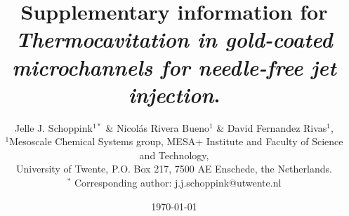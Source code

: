 \documentclass[11pt]{article}
\title{\vspace{-3 cm}\noindent \huge Supplementary information for \textit{Thermocavitation in gold-coated microchannels for needle-free jet injection}.}
\author{Jelle J. Schoppink$^{1*}$ \& Nicolás Rivera Bueno$^1$ \&
David Fernandez Rivas$^1$, \\ 
\small$^1$Mesoscale Chemical Systems group, MESA+ Institute and Faculty of Science and Technology, \\  
\small University  of Twente, P.O. Box 217, 7500 AE Enschede, the Netherlands. \\
\small $^*$ Corresponding author: j.j.schoppink@utwente.nl}
\date{\today}
\newenvironment{supplement}{
		\setcounter{table}{0}
\renewcommand{\thetable}{SI \arabic{table}}%
		\setcounter{section}{0}
\renewcommand{\thesection}{SI \arabic{section}}%
\setcounter{figure}{0}
\renewcommand{\thefigure}{SI \arabic{figure}}%
}
\begin{document}
 \maketitle 



\begin{supplement}

\section{Laser beam shapes}\label{C4: Suppl: Sec: Beam shapes}

\begin{figure}[b!]
	\centering
	\vspace{3 mm}
	\begin{minipage}[t]{0.3\linewidth}
		\centering
		\texttt{[image: Beam\_45\_e2\_full2.eps]}
	\end{minipage}
	\hspace{0.5cm}
	\begin{minipage}[t]{0.3\linewidth}
		\centering
		\texttt{[image: Beam\_90\_e2\_full2.eps]}
	\end{minipage}
	\caption{Laser beam shapes on the metallic layer captured by the camera for the 45~nm (left) and 90~nm (right) layer, imaged in colormap `turbo'. The white boxes correspond to the normalized intensity equal to 1/e$^{2}$ ($\approx 0.135$), from which the calculated beam radii are 69 (left) and 68~µm (right).}
	\label{C4: suppl: fig: beam shapes}
\end{figure}
To create a reproducible beam shape for each experiment, the microfluidic chip is positioned using 3-axis stage (Thorlabs Rollerblock) which allows for micrometer accuracy positioning. As the laser beam is diverging, exact positioning is required to ensure the same identical beam size. Prior to each experiment, the beam size is imaged using the camera. 
Figure~\ref{C4: Suppl: Sec: Beam shapes} shows the laser beam shapes on the metallic layer, for the 45 and 90~nm, respectively. These images are taken in the same configuration as the experiments (see Figure~1 in the main manuscript), but without the orange filter front of the camera, which normally blocks the blue laser light to protect it. As the camera is positioned at an angle, the images show the scattered laser light on the metallic layer. In both figures, the beam radius (1/e$^{2}$) is found to be approximately 70~nm. However, after further analysis, it was found that the intensity profiles are slightly different. The right image (90~nm) has a wider region of high intensity (red dots), whereas the high-intensity region in the left image is smaller. As the heat diffusion on the gold layer is much faster compared to the nucleation times, it is hypothesized that this is not significant. Furthermore, assuming the delivered energy is constant, the beam size does not have a significant effect on the bubble dynamics~\cite{Schoppink2024}.




\end{supplement}
\end{document}
